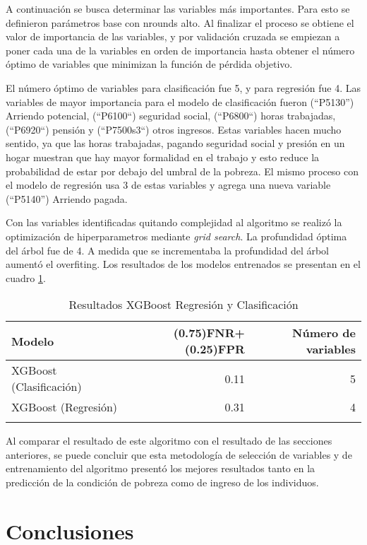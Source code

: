 \documentclass[11pt,a4paper]{article}
\begin{document}
A continuación se busca determinar las variables más importantes. Para esto se definieron parámetros base con nrounds alto. Al finalizar el proceso se obtiene el valor de importancia de las variables, y por validación cruzada se empiezan a poner cada una de la variables en orden de importancia hasta obtener el número óptimo de variables que minimizan la función de pérdida objetivo.

El número óptimo de variables para clasificación fue 5, y para regresión fue 4. Las variables de mayor importancia para el modelo de clasificación fueron (“P5130”) Arriendo potencial, (“P6100“) seguridad social, (“P6800“) horas trabajadas, (“P6920“) pensión y (“P7500s3“) otros ingresos. Estas variables hacen mucho sentido, ya que las horas trabajadas, pagando seguridad social y presión en un hogar muestran que hay mayor formalidad en el trabajo y esto reduce la probabilidad de estar por debajo del umbral de la pobreza. El mismo proceso con el modelo de regresión usa 3 de estas variables y agrega una nueva variable (“P5140”) Arriendo pagada.

Con las variables identificadas quitando complejidad al algoritmo se realizó la optimización de hiperparametros mediante \emph{grid search}. La profundidad óptima del árbol fue de 4. A medida que se incrementaba la profundidad del árbol aumentó el overfiting. Los resultados de los modelos entrenados se presentan en el cuadro \ref{xgboost}.

\begin{table}[H]
\caption{Resultados XGBoost Regresión y Clasificación}
\centering
\begin{tabular}{lrr}
\toprule
Modelo & (0.75)FNR+(0.25)FPR & Número de variables\\
\midrule
XGBoost (Clasificación) & 0.11 & 5\\
XGBoost (Regresión) & 0.31 & 4\\
\bottomrule
\label{xgboost}
\end{tabular}
\end{table}


Al comparar el resultado de este algoritmo con el resultado de las secciones anteriores, se puede concluir que esta metodología de selección de variables y de entrenamiento del algoritmo presentó los mejores resultados tanto en la predicción de la condición de pobreza como de ingreso de los individuos.


\section{Conclusiones}
\end{document}
